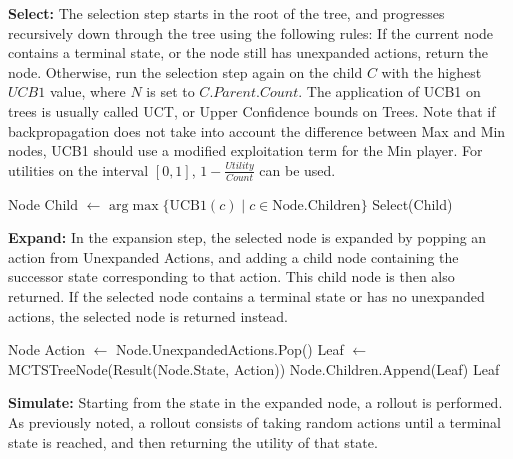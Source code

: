 \textbf{Select:} The selection step starts in the root of the tree,
and progresses recursively down through the tree using the following
rules: If the current node contains a terminal state, or the node still has unexpanded actions, return the node. Otherwise, run the selection
step again on the child $C$ with the highest $UCB1$ value, where $N$ is set to $C.Parent.Count$. The application of UCB1 on trees is usually called UCT, or Upper Confidence bounds on Trees.
Note that if backpropagation does not take into account the difference
between Max and Min nodes, UCB1 should use a modified exploitation term 
for the Min player. For utilities on the interval $[0,1]$, 
$1 - \frac{Utility}{Count}$ can be used.
\begin{algorithm}
    \begin{algorithmic}[1]
                \State \Return Node
            \EndIf
            \State Child $\gets$ 
            $\text{arg}\max \{ \text{UCB1}(c) \;|\; c \in \text{Node.Children} \}$ 
            \State \Return Select(Child)
        \EndProcedure
    \end{algorithmic}        
\end{algorithm}

\newpage
\textbf{Expand:} In the expansion step, the selected node is expanded by 
popping an action from Unexpanded Actions, and adding a child 
node containing the successor state corresponding to that action. This
child node is then also returned. If the selected node contains a terminal 
state or has no unexpanded actions, the selected node is returned instead.

\begin{algorithm}[H]
    \begin{algorithmic}[1]
                \State \Return Node
            \EndIf
            \State Action $\gets$ Node.UnexpandedActions.Pop()
            \State Leaf $\gets$ MCTSTreeNode(Result(Node.State, Action))
            \State Node.Children.Append(Leaf)
            \State \Return Leaf
        \EndProcedure
    \end{algorithmic}    
\end{algorithm}


\textbf{Simulate:} Starting from the state in the expanded node, a rollout
is performed. As previously noted, a rollout consists of taking random
actions until a terminal state is reached, and then returning the utility
of that state.

